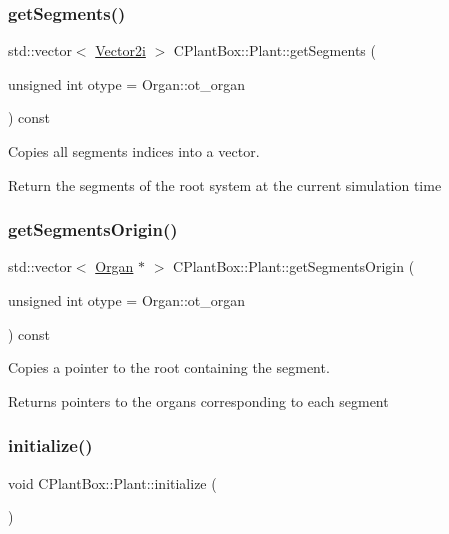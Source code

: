 \subsubsection{\texorpdfstring{get\+Segments()}{getSegments()}}
{\footnotesize\ttfamily std\+::vector$<$ \hyperlink{classCPlantBox_1_1Vector2i}{Vector2i} $>$ C\+Plant\+Box\+::\+Plant\+::get\+Segments (\begin{DoxyParamCaption}\item[{unsigned int}]{otype = {\ttfamily Organ\+:\+:ot\+\_\+organ} }\end{DoxyParamCaption}) const}



Copies all segments indices into a vector. 

Return the segments of the root system at the current simulation time \mbox{\label{classCPlantBox_1_1Plant_a485eaddf68bf18f53e0599ece3e67846}} 
\subsubsection{\texorpdfstring{get\+Segments\+Origin()}{getSegmentsOrigin()}}
{\footnotesize\ttfamily std\+::vector$<$ \hyperlink{classCPlantBox_1_1Organ}{Organ} $\ast$ $>$ C\+Plant\+Box\+::\+Plant\+::get\+Segments\+Origin (\begin{DoxyParamCaption}\item[{unsigned int}]{otype = {\ttfamily Organ\+:\+:ot\+\_\+organ} }\end{DoxyParamCaption}) const}



Copies a pointer to the root containing the segment. 

Returns pointers to the organs corresponding to each segment \mbox{\label{classCPlantBox_1_1Plant_a4ef8bb05bda53551c0c32d8c72db1f0c}} 
\subsubsection{\texorpdfstring{initialize()}{initialize()}}
{\footnotesize\ttfamily void C\+Plant\+Box\+::\+Plant\+::initialize (\begin{DoxyParamCaption}{ }\end{DoxyParamCaption})}



